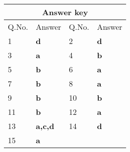 \setlength\arrayrulewidth{1pt}
\begin{table}[H]
	\centering
	\begin{tabular}{|p{1.5cm}|p{1.5cm}||p{1.5cm}|p{1.5cm}|}
		\hline
		\multicolumn{4}{|c|}{\textbf{Answer key}}\\\hline\hline
		\rowcolor{ocrel}Q.No.&Answer&Q.No.&Answer\\\hline
		1&\textbf{d} &2&\textbf{d}\\\hline 
		3&\textbf{a} &4&\textbf{b} \\\hline
		5&\textbf{b} &6&\textbf{a} \\\hline
		7&\textbf{b}&8&\textbf{a}\\\hline
		9&\textbf{b}&10&\textbf{b}\\\hline
		11&\textbf{b} &12&\textbf{a}\\\hline
		13&\textbf{a,c,d}&14&\textbf{d}\\\hline
		15&\textbf{a}& &\\\hline
		
	\end{tabular}
\end{table}	

